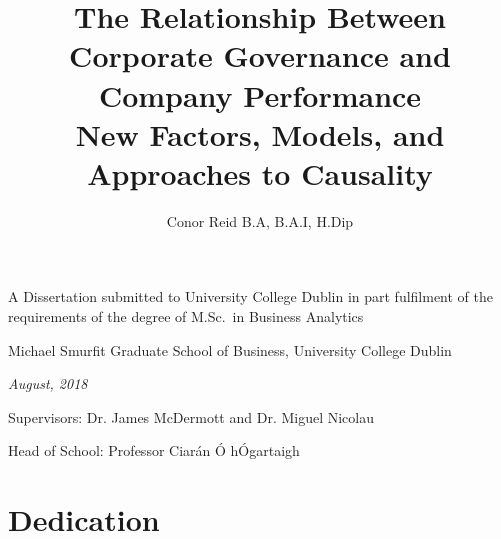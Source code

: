 \documentclass[a4paper,12pt,bibtotoc,notitlepage,oneside]{book}
\numberwithin{equation}{section}  %
\numberwithin{figure}{chapter}    %
\begin{document}
\frontmatter %

\title%
    {\bf The Relationship Between Corporate Governance and Company Performance\\
   \Large{ New Factors, Models, and Approaches to Causality}}

\author{Conor Reid B.A, B.A.I, H.Dip}  %
\date{}
\maketitle %

{\normalsize
\vfill
\begin{center}
\textup{A Dissertation submitted to University College Dublin in part fulfilment
of the requirements of the degree of M.Sc.~in Business Analytics}
\end{center}
\vfill
\begin{center}
Michael Smurfit Graduate School of Business,
University College Dublin
\end{center}
\vfill
\begin{center}
\textit{August, 2018}
\end{center}
\vfill
\begin{center}
\textup{Supervisors: Dr. James McDermott and Dr. Miguel Nicolau}
\end{center}
\vfill
\begin{center}
\textup{Head of School: Professor Ciar\'an \'O h\'Ogartaigh}
\end{center}
\vfill
}

\thispagestyle{empty} %

\clearpage %




\chapter*{Dedication}
\end{document}
